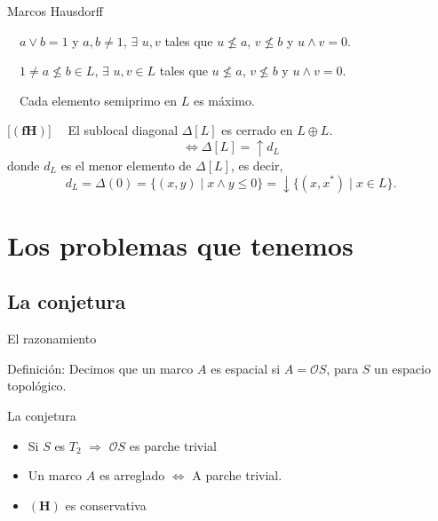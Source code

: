 \documentclass[compress,12pt]{beamer}
\begin{document}
\begin{frame}{Marcos Hausdorff}
	\begin{description}
        \item[$(\mathbf{dH})$] $\quad a\vee b=1$ y $a, b\neq 1$, $\exists$ $u, v$ tales que $u\nleq a$, $v\nleq b$ y $u\wedge v=0$. 
        \item<2->[$(\mathbf{H})$] $\quad 1\neq a\nleq b\in L$, $\exists$ $u, v\in L$ tales que $u\nleq a$, $v\nleq b$ y $u\wedge v=0$. 
        \item<3->[$(\mathbf{Hp})$] $\quad$Cada elemento semiprimo en $L$ es máximo.
        \item<4->{[$(\mathbf{fH})$] $\quad$El sublocal diagonal $\Delta[L]$ es cerrado en $L\oplus L$.
        \[
        \Leftrightarrow \Delta[L]=\uparrow d_L
        \]
        donde $d_L$ es el menor elemento de $\Delta[L]$, es decir,
\[
d_L=\Delta(0)=\{(x, y)\mid x\wedge y\leq 0\}=\downarrow\{(x, x^*)\mid x\in L\}.
\]}
    \end{description}
\end{frame}

\section{Los problemas que tenemos}
\subsection{La conjetura}
\begin{frame}{El razonamiento}
	\begin{block}{Definición:}
		Decimos que un marco $A$ es espacial si $A=\mathcal{O}S$, para $S$ un espacio topológico.
	\end{block}
	


\end{frame}

\begin{frame}{La conjetura}

		\begin{itemize}
			\item Si $S$ es $T_2$ $\Rightarrow$ $\mathcal{O}S$ es parche trivial
			\item<2-> Un marco $A$ es arreglado $\Leftrightarrow$ A parche trivial.
			\item<3-> $\mathbf{(H)}$ es conservativa
		\end{itemize}
	
	
\end{frame}
\end{document}
